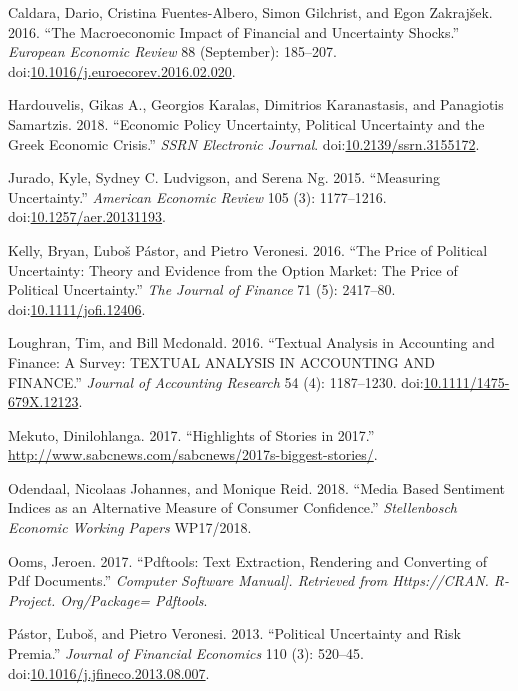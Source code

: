 \documentclass[11pt,preprint, authoryear]{elsarticle}
\numberwithin{equation}{section}
\numberwithin{figure}{section}
\numberwithin{table}{section}
\begin{document}
\hypertarget{ref-Caldara2016}{}
Caldara, Dario, Cristina Fuentes-Albero, Simon Gilchrist, and Egon
Zakrajšek. 2016. ``The Macroeconomic Impact of Financial and Uncertainty
Shocks.'' \emph{European Economic Review} 88 (September): 185--207.
doi:\href{https://doi.org/10.1016/j.euroecorev.2016.02.020}{10.1016/j.euroecorev.2016.02.020}.

\hypertarget{ref-Hardouvelis2018}{}
Hardouvelis, Gikas A., Georgios Karalas, Dimitrios Karanastasis, and
Panagiotis Samartzis. 2018. ``Economic Policy Uncertainty, Political
Uncertainty and the Greek Economic Crisis.'' \emph{SSRN Electronic
Journal}.
doi:\href{https://doi.org/10.2139/ssrn.3155172}{10.2139/ssrn.3155172}.

\hypertarget{ref-Jurado2015}{}
Jurado, Kyle, Sydney C. Ludvigson, and Serena Ng. 2015. ``Measuring
Uncertainty.'' \emph{American Economic Review} 105 (3): 1177--1216.
doi:\href{https://doi.org/10.1257/aer.20131193}{10.1257/aer.20131193}.

\hypertarget{ref-Kelly2016}{}
Kelly, Bryan, Ľuboš Pástor, and Pietro Veronesi. 2016. ``The Price of
Political Uncertainty: Theory and Evidence from the Option Market: The
Price of Political Uncertainty.'' \emph{The Journal of Finance} 71 (5):
2417--80.
doi:\href{https://doi.org/10.1111/jofi.12406}{10.1111/jofi.12406}.

\hypertarget{ref-Loughran2016}{}
Loughran, Tim, and Bill Mcdonald. 2016. ``Textual Analysis in Accounting
and Finance: A Survey: TEXTUAL ANALYSIS IN ACCOUNTING AND FINANCE.''
\emph{Journal of Accounting Research} 54 (4): 1187--1230.
doi:\href{https://doi.org/10.1111/1475-679X.12123}{10.1111/1475-679X.12123}.

\hypertarget{ref-Mekuto2017}{}
Mekuto, Dinilohlanga. 2017. ``Highlights of Stories in 2017.''
\url{http://www.sabcnews.com/sabcnews/2017s-biggest-stories/}.

\hypertarget{ref-Odendaal2018}{}
Odendaal, Nicolaas Johannes, and Monique Reid. 2018. ``Media Based
Sentiment Indices as an Alternative Measure of Consumer Confidence.''
\emph{Stellenbosch Economic Working Papers} WP17/2018.

\hypertarget{ref-Ooms2017}{}
Ooms, Jeroen. 2017. ``Pdftools: Text Extraction, Rendering and
Converting of Pdf Documents.'' \emph{Computer Software Manual{]}.
Retrieved from Https://CRAN. R-Project. Org/Package= Pdftools}.

\hypertarget{ref-Pastor2013}{}
Pástor, Ľuboš, and Pietro Veronesi. 2013. ``Political Uncertainty and
Risk Premia.'' \emph{Journal of Financial Economics} 110 (3): 520--45.
doi:\href{https://doi.org/10.1016/j.jfineco.2013.08.007}{10.1016/j.jfineco.2013.08.007}.
\end{document}
